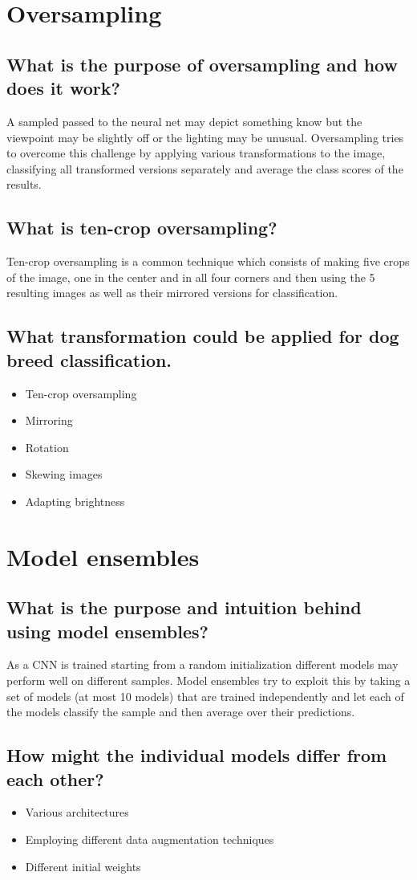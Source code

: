 \section{Oversampling}
\subsection{What is the purpose of oversampling and how does it work?}
A sampled passed to the neural net may depict something know but the viewpoint may be slightly off or the lighting may be unusual. Oversampling tries to overcome this challenge by applying various transformations to the image, classifying all transformed versions separately and average the class scores of the results. 
\subsection{What is ten-crop oversampling?}
Ten-crop oversampling is a common technique which consists of making five crops of the image, one in the center and in all four corners and then using the 5 resulting images as well as their mirrored versions for classification. 
\subsection{What transformation could be applied for dog breed classification.}
\begin{itemize}
\item Ten-crop oversampling
\item Mirroring
\item Rotation
\item Skewing images
\item Adapting brightness
\end{itemize}
%
\section{Model ensembles}
\subsection{What is the purpose and intuition behind using model ensembles?}
As a CNN is trained starting from a random initialization different models may perform well on different samples. Model ensembles try to exploit this by taking a set of models (at most 10 models) that are trained independently and let each of the models classify the sample and then average over their predictions.
\subsection{How might the individual models differ from each other?}
\begin{itemize}
\item Various architectures
\item Employing different data augmentation techniques
\item Different initial weights
\end{itemize}
%
